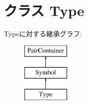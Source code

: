 \hypertarget{classslicc_1_1symbols_1_1Type_1_1Type}{
\section{クラス Type}
\label{classslicc_1_1symbols_1_1Type_1_1Type}
}
Typeに対する継承グラフ:\begin{figure}[H]
\begin{center}
\leavevmode
\includegraphics[height=3cm]{classslicc_1_1symbols_1_1Type_1_1Type}
\end{center}
\end{figure}
